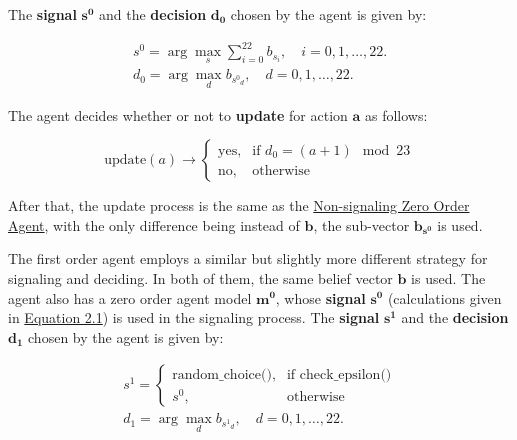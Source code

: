 The \textbf{signal} $\mathbf{s^0}$ and the \textbf{decision} $\mathbf{d_0}$ chosen by the agent is given by:

\begin{equation*}
\label{eq:zero-order-signal}
\begin{aligned}
    s^0 = \arg\max_s \sum_{i=0}^{22} b_{s_i}, \quad i = 0, 1, \ldots, 22. \\
    d_0 = \arg\max_d b_{{s^0}_d}, \quad d = 0, 1, \ldots, 22.
\end{aligned}
\end{equation*}

The agent decides whether or not to \textbf{update} for action $\mathbf{a}$ as follows: 

\begin{equation}
\text{{update}}(a) \rightarrow \begin{cases}
\text{{yes}}, & \text{{if }} d_0 = (a + 1) \mod 23 \\
\text{{no}}, & \text{{otherwise}}
\end{cases}
\end{equation}

After that, the update process is the same as the \hyperref[eq:zero-order-update]{Non-signaling Zero Order Agent}, with the only difference being instead of $\mathbf{b}$, the sub-vector $\mathbf{b_{s^0}}$ is used.


The first order agent employs a similar but slightly more different strategy for signaling and deciding. In both of them, the same belief vector $\mathbf{b}$ is used. The agent also has a zero order agent model $\mathbf{m^0}$, whose \textbf{signal} $\mathbf{s^0}$ (calculations given in \hyperref[eq:zero-order-signal]{Equation 2.1}) is used in the  signaling process. The \textbf{signal} $\mathbf{s^1}$ and the \textbf{decision} $\mathbf{d_1}$ chosen by the agent is given by:

\begin{equation*}
\begin{aligned}
    s^1 = \begin{cases}
        \text{{random\_choice()}}, & \text{{if }} \text{{check\_epsilon()}} \\
        s^0, & \text{{otherwise}}
    \end{cases} \\
    d_1 = \arg\max_d b_{{s^1}_d}, \quad d = 0, 1, \ldots, 22. \qquad
\end{aligned}
\end{equation*}

